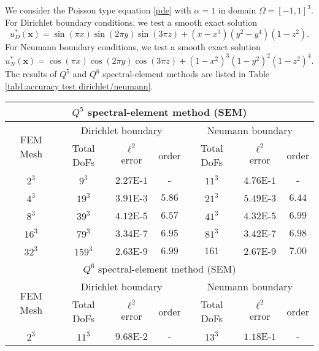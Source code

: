 \documentclass{article}
\newcommand{\bx}{\bm{x}}
\begin{document}
We consider the Poisson type equation \eqref{pde}
with $\alpha = 1$ in domain $\Omega = [-1,1]^3$. For Dirichlet boundary conditions, we test a smooth exact solution
\begin{equation*}
    u_{D}^{*}(\bx) = \sin(\pi x)\sin(2\pi y)\sin(3\pi z) + (x-x^3)(y^2-y^4)(1-z^2).
\end{equation*}
For Neumann boundary conditions, we test a smooth exact solution
\begin{equation*}
    u_{N}^{*}(\bx) = \cos(\pi x)\cos(2\pi y)\cos(3\pi z) + (1-x^2)^3(1-y^2)^2(1-z^2)^4.
\end{equation*}
The results of $Q^5$ and $Q^6$ spectral-element    methods are listed in Table \ref{tab1:accuracy test dirichlet/neumann}.  
\begin{table}[!ht]
    \centering
    \begin{tabular}{|c|c c c|c c c|}
    \hline
    \multicolumn{7}{|c|}{$Q^5$ spectral-element method (SEM)}\\
    \hline
    \multirow{2}{*}{FEM Mesh} &  \multicolumn{3}{c|}{Dirichlet boundary} &  \multicolumn{3}{c|}{Neumann boundary}\\
     & {Total DoFs}  & $\ell^2$ error & order & {Total DoFs}  & $\ell^2$ error & order\\
    \hline
    $2^3$ &$9^3$ &  $2.27$E-$1$ & - & $11^3$ & $4.76$E-$1$ & - \\
    \hline
    $4^3$ & $19^3$ &  $3.91$E-$3$ & $5.86$ & $21^3$ & $5.49$E-$3$ & $6.44$\\
    \hline
    $8^3$ & $39^3$ &  $4.12$E-$5$ & $6.57$ & $41^3$ & $4.32$E-$5$ & $6.99$\\
    \hline
    $16^3$ & $79^3$ & $3.34$E-$7$ & $6.95$ & $81^3$ & $3.42$E-$7$ & $6.98$\\
    \hline
    $32^3$ & $159^3$ & $2.63$E-$9$ & $6.99$ & $161$ & $2.67$E-$9$ & $7.00$\\
    \hline
    \hline
    \multicolumn{7}{|c|}{$Q^6$ spectral-element method (SEM)}\\
    \hline
    \multirow{2}{*}{FEM Mesh} &  \multicolumn{3}{c|}{Dirichlet boundary} & \multicolumn{3}{c|}{Neumann boundary}\\
     & {Total DoFs}  & $\ell^2$ error & order & {Total DoFs}  & $\ell^2$ error & order\\
    \hline
    $2^3$ & $11^3$ &  $9.68$E-$2$ & - & $13^3$ & $1.18$E-$1$ & - \\

\end{tabular}
\end{table}
\end{document}
